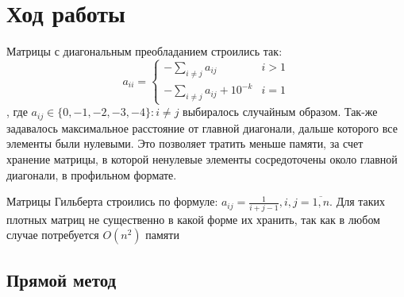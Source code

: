 \documentclass[english]{article}
\begin{document}
\section{Ход работы}
Матрицы с диагональным преобладанием строились так:
\[ a_{ii} = \begin{cases}
  -\sum\limits_{i \neq j} a_{ij} & i > 1 \\
  -\sum\limits_{i \neq j} a_{ij} + 10^{-k} & i = 1
\end{cases} \]
, где \(a_{ij} \in \{0, -1, -2, -3, -4\}: i \neq j \) выбиралось
случайным образом. Так-же задавалось максимальное расстояние от главной
диагонали, дальше которого все элементы были нулевыми. Это позволяет
тратить меньше памяти, за счет хранение матрицы, в которой ненулевые
элементы сосредоточены около главной диагонали, в профильном
формате.

Матрицы Гильберта строились по формуле: \(a_{ij} = \frac{1}{i + j -
  1}, i,j = \overline{1, n}\). Для таких плотных матриц не существенно
в какой форме их хранить, так как в любом случае потребуется
\(O(n^2)\) памяти

\subsection{Прямой метод}
\end{document}

